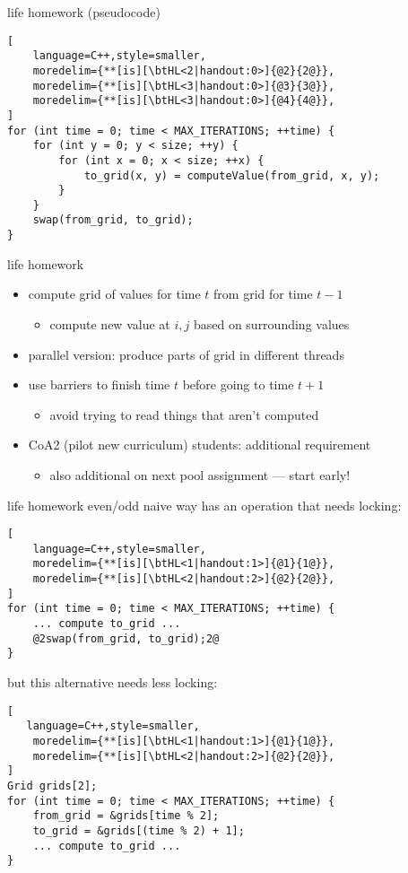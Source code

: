 \begin{frame}[fragile,label=lifeHW]{life homework (pseudocode)}
\begin{lstlisting}[
    language=C++,style=smaller,
    moredelim={**[is][\btHL<2|handout:0>]{@2}{2@}},
    moredelim={**[is][\btHL<3|handout:0>]{@3}{3@}},
    moredelim={**[is][\btHL<3|handout:0>]{@4}{4@}},
]
for (int time = 0; time < MAX_ITERATIONS; ++time) {
    for (int y = 0; y < size; ++y) {
        for (int x = 0; x < size; ++x) {
            to_grid(x, y) = computeValue(from_grid, x, y);
        }
    }
    swap(from_grid, to_grid);
}
\end{lstlisting}
\end{frame}

\begin{frame}{life homework}
\begin{itemize}
\item compute grid of values for time $t$ from grid for time $t-1$
    \begin{itemize}
    \item compute new value at $i,j$ based on surrounding values
    \end{itemize}
\vspace{.5cm}
\item parallel version: produce parts of grid in different threads
\item use barriers to finish time $t$ before going to time $t+1$
    \begin{itemize}
    \item avoid trying to read things that aren't computed
    \end{itemize}
\vspace{.5cm}
\item CoA2 (pilot new curriculum) students: additional requirement
    \begin{itemize}
    \item also additional on next pool assignment --- start early!
    \end{itemize}
\end{itemize}
\end{frame}

\begin{frame}[fragile,label=lifeEvenOdd]{life homework even/odd}
naive way has an operation that needs locking:
\begin{lstlisting}[
    language=C++,style=smaller,
    moredelim={**[is][\btHL<1|handout:1>]{@1}{1@}},
    moredelim={**[is][\btHL<2|handout:2>]{@2}{2@}},
]
for (int time = 0; time < MAX_ITERATIONS; ++time) {
    ... compute to_grid ...
    @2swap(from_grid, to_grid);2@
}
\end{lstlisting}
but this alternative needs less locking:
\begin{lstlisting}[
   language=C++,style=smaller,
    moredelim={**[is][\btHL<1|handout:1>]{@1}{1@}},
    moredelim={**[is][\btHL<2|handout:2>]{@2}{2@}},
]
Grid grids[2];
for (int time = 0; time < MAX_ITERATIONS; ++time) {
    from_grid = &grids[time % 2];
    to_grid = &grids[(time % 2) + 1];
    ... compute to_grid ...
}
\end{lstlisting}
\end{frame}
